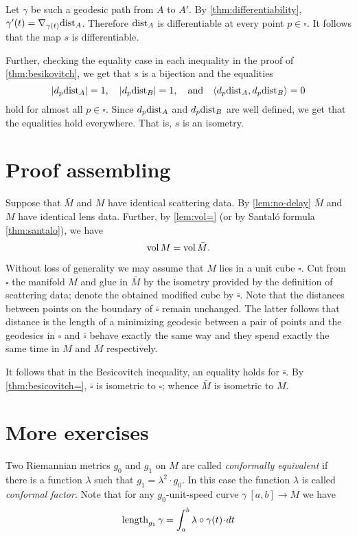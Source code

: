 Let $\gamma$ be such a geodesic path from $A$ to $A'$.
By \ref{thm:differentiability}, $\gamma'(t)\z=\nabla_{\gamma(t)}\distfun_A$.
Therefore $\mathrm{dist}_A$ is differentiable at every point $p\in \square$.
It follows that the map $s$ is differentiable.

Further, checking the equality case in each inequality in the proof of \ref{thm:besikovitch}, we get that $s$ is a bijection and the equalities
\[|d_{p}\mathrm{dist}_A|= 1,\quad|d_{p}\mathrm{dist}_B|=1,\quad \text{and}\quad \langle d_{p}\mathrm{dist}_A,d_{p}\mathrm{dist}_B\rangle= 0\]
hold for almost all $p\in\square$.
Since $d_{p}\mathrm{dist}_A$ and $d_{p}\mathrm{dist}_B$ are well defined, we get that the equalities hold everywhere.
That is, $s$ is an isometry.
\qeds


\section{Proof assembling}

Suppose that $\bar M$ and $M$ have identical scattering data.
By \ref{lem:no-delay} $\bar M$ and $M$ have identical lens data.
Further, by \ref{lem:vol=} (or by Santal\'{o} formula \ref{thm:santalo}), we have
\[\operatorname{\rm vol}\nolimits M=\operatorname{\rm vol}\nolimits \bar M.\]

Without loss of generality we may assume that $M$ lies in a unit cube $\square$.
Cut from $\square$ the manifold $M$ and glue in $\bar M$ by the isometry provided by the definition of scattering data; denote the obtained modified cube by $\bar\square$. 
Note that the distances between points on the boundary of $\bar\square$ remain unchanged.
The latter follows that distance is the length of a minimizing geodesic between a pair of points and the geodesics in $\square$ and $\bar\square$ behave exactly the same way and they spend exactly the same time in $M$ and $\bar M$ respectively.

It follows that in the Besicovitch inequality, an equality holds for $\bar\square$.
By \ref{thm:besicovitch=}, $\bar\square$ is isometric to $\square$;
whence $\bar M$ is isometric to $M$.
\qeds

\section{More exercises}

Two Riemannian metrics $g_0$ and $g_1$ on $M$ are called \emph{conformally equivalent} if there is a function $\lambda$ such that $g_1=\lambda^2\cdot g_0$.
In this case the function $\lambda$ is called \emph{conformal factor}.
Note that for any $g_0$-unit-speed curve $\gamma\:[a,b]\to M$ 
we have
\[\length_{g_1}\gamma=\int_a^b\lambda\circ\gamma(t)\cdot dt\]

